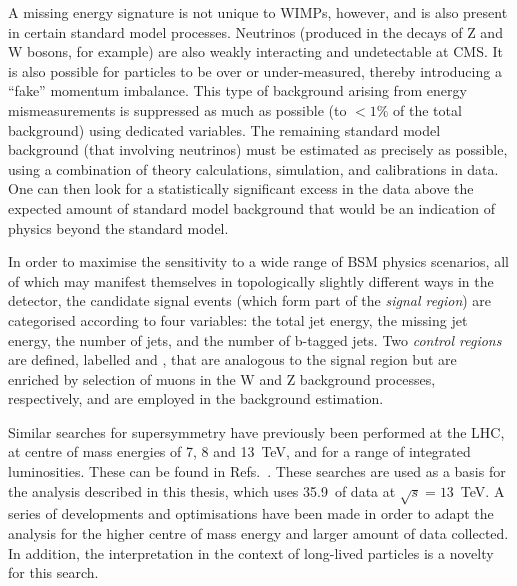 A missing energy signature is not unique to WIMPs, however, and is also present 
in certain standard model processes. Neutrinos (produced in the decays of Z and 
W bosons, for example) are also weakly interacting and undetectable at CMS. It 
is also possible for particles to be over or under-measured, thereby 
introducing a ``fake'' momentum imbalance. This type of background arising from 
energy mismeasurements is suppressed as much as possible (to $<1\%$ of the 
total background) using dedicated variables. %
The remaining standard 
model background (that involving neutrinos) must be estimated as precisely as 
possible, using a combination of theory calculations, simulation, and 
calibrations in data. %
One can then look for a 
statistically significant excess in the data above the expected amount of 
standard model background that would be an indication of %
physics beyond the standard model. %

In order to maximise the sensitivity to a wide range of BSM physics %
scenarios, 
all of which may manifest themselves in topologically slightly different ways 
in the detector, the candidate signal events (which form part of the 
\textit{signal region}) are categorised according to four variables: the total 
jet energy, the missing jet energy, the number of jets, and the number of 
b-tagged jets. %
Two \textit{control regions} are defined, labelled \mj and 
\mmj, that are analogous to the signal region but are enriched by 
selection of muons in the W and Z background processes, respectively, and are 
employed in the background estimation.%

Similar searches for supersymmetry have previously been performed %
at the LHC, at centre of mass energies of 7, 8 and 13~TeV, and for a range of 
integrated luminosities. These can be found in 
Refs.~\cite{alphat1,alphat2,alphat3,alphat4,alphat5}. These 
searches are used as a basis for the analysis described in this thesis, which 
uses 35.9~\ifb of data at $\sqrt{s}=13$~TeV. A 
series of developments and optimisations have been made in order to adapt the 
analysis for the higher centre of mass energy and larger amount of data 
collected. In addition, the interpretation in the context of %
long-lived particles %
is a novelty for this search.


